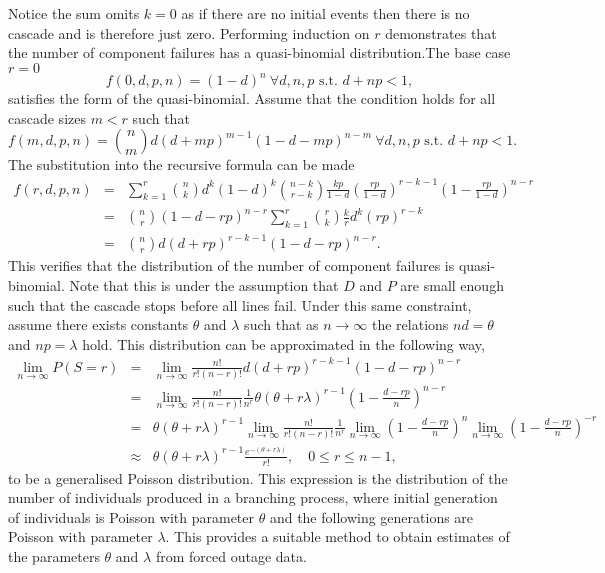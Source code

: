 \documentclass{article}
\begin{document}
Notice the sum omits $k=0$ as if there are no initial events then there is no cascade and is therefore just zero. Performing induction on $r$ demonstrates that the number of component failures has a quasi-binomial distribution.The base case $r=0$ 
\[f(0,d,p,n) = (1-d)^n \ \forall d,n,p \text{ s.t. } d+np<1,\] 
satisfies the form of the quasi-binomial. Assume that the condition holds for all cascade sizes $m<r$ such that
\[ f(m,d,p,n) = {n\choose m} d(d+mp)^{m-1} (1-d-mp)^{n-m} \ \forall d,n,p \text{ s.t. } d+np<1.\]
The substitution into the recursive formula can be made
\begin{eqnarray*}
f(r,d,p,n)&=&\sum_{k=1}^{r} {n\choose k} d^k(1-d)^k {n-k \choose r-k} \frac{kp}{1-d} \left(\frac{rp}{1-d}\right)^{r-k-1} \left(1-\frac{rp}{1-d}\right)^{n-r}\\
&=&{n \choose r} \left(1-d-rp\right)^{n-r} \sum_{k=1}^{r} {r\choose k} \frac{k}{r} d^k \left(rp\right)^{r-k}\\
&=& {n \choose r} d (d+rp)^{r-k-1} \left(1-d-rp\right)^{n-r}.
\end{eqnarray*}
This verifies that the distribution of the number of component failures is quasi-binomial. Note that this is under the assumption that $D$ and $P$ are small enough such that the cascade stops before all lines fail. Under this same constraint, assume there exists constants $\theta$ and $\lambda$ such that as $n\to \infty$ the relations $nd = \theta$ and $np = \lambda$ hold. This distribution can be approximated in the following way,
\begin{eqnarray*}
\lim_{n\to \infty} P(S=r) &=& \lim_{n\to \infty} \frac{n!}{r!(n-r)!} d (d+rp)^{r-k-1} \left(1-d-rp\right)^{n-r}\\
&=& \lim_{n\to \infty} \frac{n!}{r!(n-r)!} \frac{1}{n^r} \theta(\theta + r\lambda)^{r-1} \left(1-\frac{d-rp}{n}\right)^{n-r}\\
&=& \theta(\theta + r\lambda)^{r-1} \lim_{n\to \infty} \frac{n!}{r!(n-r)!} \frac{1}{n^r} \lim_{n\to \infty} \left(1-\frac{d-rp}{n}\right)^{n} \lim_{n\to \infty} \left(1-\frac{d-rp}{n}\right)^{-r}\\
&\approx& \theta(\theta + r\lambda)^{r-1} \frac{e^{-(\theta+r\lambda)}}{r!}, \quad 0\le r\le n-1,
\end{eqnarray*}
to be a generalised Poisson distribution. This expression is the distribution of the number of individuals produced in a branching process, where initial generation of individuals is Poisson with parameter $\theta$ and the following generations are Poisson with parameter $\lambda$. This provides a suitable method to obtain estimates of the parameters $\theta$ and $\lambda$ from forced outage data.
\end{document}
